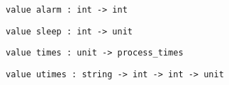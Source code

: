 \begin{verbatim}
value alarm : int -> int
\end{verbatim}
%
\begin{comment}
 Schedule a \verbSIGALRM signals after the given number of seconds. 
\end{comment}
\begin{verbatim}
value sleep : int -> unit
\end{verbatim}
%
\begin{comment}
 Stop execution for the given number of seconds. 
\end{comment}
\begin{verbatim}
value times : unit -> process_times
\end{verbatim}
%
\begin{comment}
 Return the execution times of the process. 
\end{comment}
\begin{verbatim}
value utimes : string -> int -> int -> unit
\end{verbatim}
%
\begin{comment}
 Set the last access time (second arg) and last modification time
           (third arg) for a file. Times are expressed in seconds from
           00:00:00 GMT, Jan. 1, 1970. 
\end{comment}
